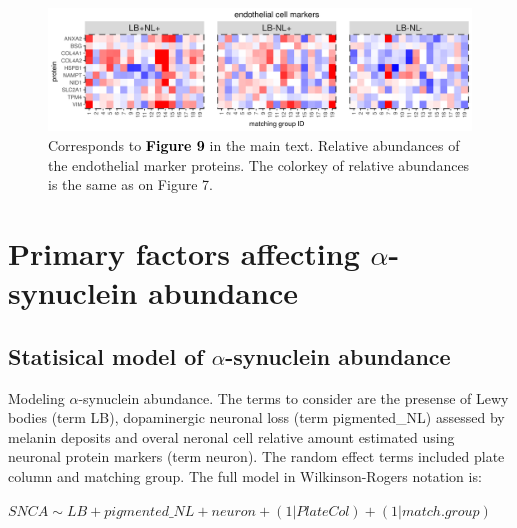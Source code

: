 \documentclass[11pt]{article}\usepackage[]{graphicx}\usepackage[usenames,dvipsnames]{color}
\newenvironment{knitrout}{}{} %
\begin{document}
\begin{figure}[h!]
\center
\begin{minipage}{1.0\textwidth}
\begin{knitrout}
\color{fgcolor}

{\centering \includegraphics[width=1\textwidth]{figure/endothelial_heatmap-1} 

}



\end{knitrout}
\caption{Corresponds to
\textcolor{black}{\colorbox{highlighter}{\textbf{Figure 9}}} in the main text.
Relative abundances of the endothelial marker proteins. 
The colorkey of relative abundances is the same as on Figure 7.}
\label{fig:EndothelialHeatmaps}
\end{minipage}
\end{figure}

\clearpage





\section{Primary factors affecting $\alpha$-synuclein abundance}

\subsection{Statisical model of $\alpha$-synuclein abundance}

Modeling $\alpha$-synuclein abundance. The terms to consider are the presense of
Lewy bodies (term LB), dopaminergic neuronal loss (term pigmented\_NL) assessed by melanin
deposits and overal neronal cell relative amount estimated using neuronal 
protein markers (term neuron). The random effect terms included plate column and 
matching group. The full model in Wilkinson-Rogers notation is:
\begin{center}
$SNCA \sim LB + pigmented\_NL + neuron + (1|PlateCol) + (1|match.group)$
\end{center}
\end{document}
